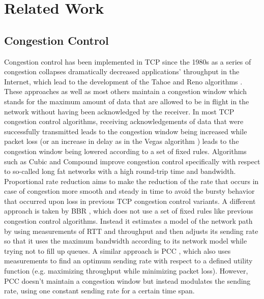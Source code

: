 \documentclass[newfonts=false,format=sigconf,10pt,letterpaper]{acmart}
\begin{document}
\section{Related Work}

\subsection{Congestion Control}

Congestion control has been implemented in TCP since the 1980s as a series of congestion collapses dramatically decreased applications' throughput in the Internet, which lead to the development of the Tahoe and Reno algorithms \cite{jacobson_congestion_1988}. These approaches as well as most others maintain a congestion window which stands for the maximum amount of data that are allowed to be in flight in the network without having been acknowledged by the receiver. In most TCP congestion control algorithms, receiving acknowledgements of data that were successfully transmitted leads to the congestion window being increased while packet loss (or an increase in delay as in the Vegas algorithm \cite{brakmo_tcp_1995}) leads to the congestion window being lowered according to a set of fixed rules. Algorithms such as Cubic and Compound \cite{ha_cubic:_2008, tan_compound_2006} improve congestion control specifically with respect to so-called long fat networks with a high round-trip time and bandwidth. Proportional rate reduction \cite{dukkipati_proportional_2011} aims to make the reduction of the rate that occurs in case of congestion more smooth and steady in time to avoid the bursty behavior that occurred upon loss in previous TCP congestion control variants. A different approach is taken by BBR \cite{cardwell_bbr:_2016}, which does not use a set of fixed rules like previous congestion control algorithms. Instead it estimates a model of the network path by using measurements of RTT and throughput and then adjusts its sending rate so that it uses the maximum bandwidth according to its network model while trying not to fill up queues. A similar approach is PCC \cite{dong_pcc:_2015}, which also uses measurements to find an optimum sending rate with respect to a defined utility function (e.g. maximizing throughput while minimizing packet loss). However, PCC doesn't maintain a congestion window but instead modulates the sending rate, using one constant sending rate for a certain time span.
\end{document}

